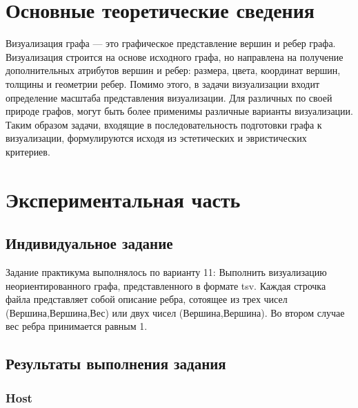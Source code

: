 \chapter{Основные теоретические сведения}
Визуализация графа — это графическое представление вершин и ребер графа. Визуализация строится на основе исходного графа, но направлена на получение дополнительных атрибутов вершин и ребер: размера, цвета, координат вершин, толщины и геометрии ребер. Помимо этого, в задачи визуализации входит определение масштаба представления визуализации. Для различных по своей природе графов, могут быть более применимы различные варианты визуализации. Таким образом задачи, входящие в последовательность подготовки графа к визуализации, формулируются исходя из эстетических и эвристических критериев.

\chapter{Экспериментальная часть}


\section{Индивидуальное задание}

Задание практикума выполнялось по варианту 11:
Выполнить визуализацию неориентированного графа, представленного в формате tsv. Каждая строчка файла представляет собой описание ребра, сотоящее из трех чисел (Вершина,Вершина,Вес) или двух чисел (Вершина,Вершина). Во втором случае вес ребра принимается равным 1.

\section{Результаты выполнения задания}

\subsection{Host}

